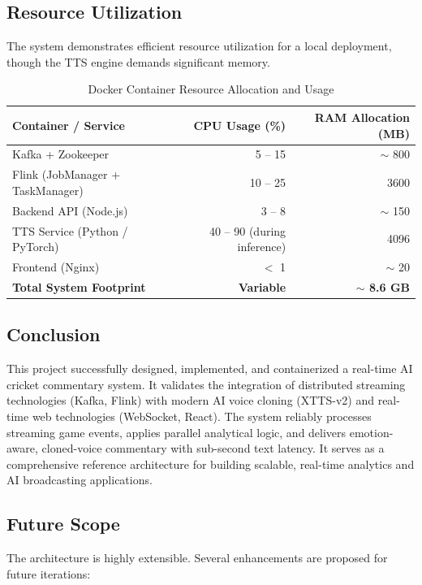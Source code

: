 \subsection{Resource Utilization}

The system demonstrates efficient resource utilization for a local deployment, though the TTS engine demands significant memory.

\begin{table}[H]
\centering
\caption{Docker Container Resource Allocation and Usage}
\label{tab:resources}
\begin{tabular}{@{}lrr@{}}
\toprule
\textbf{Container / Service} & \textbf{CPU Usage (\%)} & \textbf{RAM Allocation (MB)} \\
\midrule
Kafka + Zookeeper & 5 -- 15 & $\sim$ 800 \\
Flink (JobManager + TaskManager) & 10 -- 25 & 3600 \\
Backend API (Node.js) & 3 -- 8 & $\sim$ 150 \\
TTS Service (Python / PyTorch) & 40 -- 90 (during inference) & 4096 \\
Frontend (Nginx) & $<$ 1 & $\sim$ 20 \\
\midrule
\textbf{Total System Footprint} & \textbf{Variable} & \textbf{$\sim$ 8.6 GB} \\
\bottomrule
\end{tabular}
\end{table}

\subsection{Conclusion}

This project successfully designed, implemented, and containerized a real-time AI cricket commentary system. It validates the integration of distributed streaming technologies (Kafka, Flink) with modern AI voice cloning (XTTS-v2) and real-time web technologies (WebSocket, React). The system reliably processes streaming game events, applies parallel analytical logic, and delivers emotion-aware, cloned-voice commentary with sub-second text latency. It serves as a comprehensive reference architecture for building scalable, real-time analytics and AI broadcasting applications.

\subsection{Future Scope}

The architecture is highly extensible. Several enhancements are proposed for future iterations:

